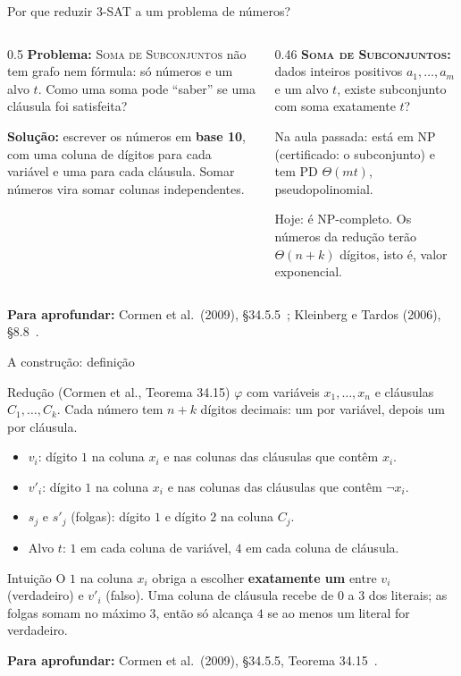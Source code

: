 \documentclass[aspectratio=169,xcolor=table]{beamer}
\newcommand{\fonte}[1]{%
  \vfill
  {\tiny\color{gray!55!black}\textbf{Para aprofundar:} #1\par}%
}
\newcommand{\prob}[1]{\textsc{#1}}
\newcommand{\nao}{\lnot}
\begin{document}
\begin{frame}{Por que reduzir \prob{3-SAT} a um problema de números?}
  \begin{columns}[T]
    \begin{column}{0.5\textwidth}
      \small
      \textbf{Problema:} \prob{Soma de Subconjuntos} não tem grafo nem fórmula: só números e
      um alvo $t$. Como uma soma pode ``saber'' se uma cláusula foi satisfeita?
      \medskip

      \textbf{Solução:} escrever os números em \textbf{base 10}, com uma coluna de dígitos para
      cada variável e uma para cada cláusula. Somar números vira somar colunas
      independentes.
    \end{column}
    \begin{column}{0.46\textwidth}
      \scriptsize
      \textbf{\prob{Soma de Subconjuntos}:} dados inteiros positivos $a_1, \ldots, a_m$ e um
      alvo $t$, existe subconjunto com soma exatamente $t$?
      \medskip

      Na aula passada: está em NP (certificado: o subconjunto) e tem PD $\Theta(mt)$,
      pseudopolinomial.
      \medskip

      Hoje: é NP-completo. Os números da redução terão $\Theta(n + k)$ dígitos, isto é,
      valor exponencial.
    \end{column}
  \end{columns}
  \fonte{Cormen et al.\ (2009), \S 34.5.5~\cite{cormen2009introduction};
    Kleinberg e Tardos (2006), \S 8.8~\cite{kleinberg2006algorithm}.}
\end{frame}

\begin{frame}{A construção: definição}
  \begin{block}{Redução (Cormen et al., Teorema 34.15)}
    \scriptsize
    $\varphi$ com variáveis $x_1, \ldots, x_n$ e cláusulas $C_1, \ldots, C_k$. Cada número tem
    $n + k$ dígitos decimais: um por variável, depois um por cláusula.
    \begin{itemize}
      \item $v_i$: dígito $1$ na coluna $x_i$ e nas colunas das cláusulas que contêm $x_i$.
      \item $v'_i$: dígito $1$ na coluna $x_i$ e nas colunas das cláusulas que contêm
            $\nao x_i$.
      \item $s_j$ e $s'_j$ (folgas): dígito $1$ e dígito $2$ na coluna $C_j$.
      \item Alvo $t$: $1$ em cada coluna de variável, $4$ em cada coluna de cláusula.
    \end{itemize}
  \end{block}
  \begin{exampleblock}{Intuição}
    \scriptsize
    O $1$ na coluna $x_i$ obriga a escolher \textbf{exatamente um} entre $v_i$ (verdadeiro) e
    $v'_i$ (falso). Uma coluna de cláusula recebe de $0$ a $3$ dos literais; as folgas somam no
    máximo $3$, então só alcança $4$ se ao menos um literal for verdadeiro.
  \end{exampleblock}
  \fonte{Cormen et al.\ (2009), \S 34.5.5, Teorema 34.15~\cite{cormen2009introduction}.}
\end{frame}
\end{document}
